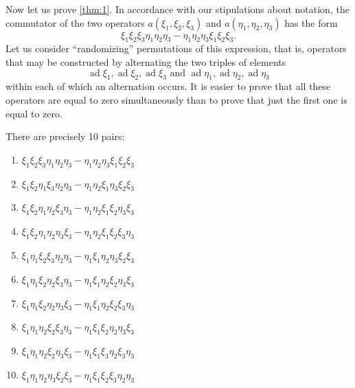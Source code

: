 \documentclass[a4paper]{article}
\newcommand{\ad}{\operatorname{ad}}
\begin{document}
Now let us prove \cref{thm:1}.
In accordance with our stipulations about notation, the commutator of the two operators $a(\xi_1, \xi_2, \xi_3)$ and $a(\eta_1, \eta_2, \eta_3)$ has the form
\begin{equation*}
	\xi_1 \xi_2 \xi_3 \eta_1 \eta_2 \eta_3-\eta_1 \eta_2 \eta_3 \xi_1 \xi_2 \xi_3.
\end{equation*}
Let us consider ``randomizing'' permutations of this expression, that is, operators that may be constructed by alternating the two triples of elements
\begin{equation*}
	\ad \xi_1, \ad \xi_2, \ad \xi_3 \text { and } \ad \eta_1, \ad \eta_2, \ad \eta_3
\end{equation*}
within each of which an alternation occurs.
It is easier to prove that all these operators are equal to zero simultaneously than to prove that just the first one is equal to zero.

There are precisely 10 pairs:
\begin{enumerate}[label=\Roman*., itemsep=0mm]
	\item $\xi_1\xi_2\xi_3\eta_1\eta_2\eta_3-\eta_1\eta_2\eta_3\xi_1\xi_2\xi_3$
	
	\item $\xi_1 \xi_2 \eta_1 \xi_3 \eta_2 \eta_3 - \eta_1 \eta_2 \xi_1 \eta_3 \xi_2 \xi_3$
	
	\item $\xi_1 \xi_2 \eta_1 \eta_2 \xi_3 \eta_3 - \eta_1 \eta_2 \xi_1 \xi_2 \eta_3 \xi_3$
	
	\item $\xi_1 \xi_2 \eta_1 \eta_2 \eta_3 \xi_3 - \eta_1 \eta_2 \xi_1 \xi_2 \xi_3 \eta_3$
	
	\item $\xi_1 \eta_1 \xi_2 \xi_3 \eta_2 \eta_3 - \eta_1 \xi_1 \eta_2 \eta_3 \xi_2 \xi_3$

	\item $\xi_1 \eta_1 \xi_2 \eta_2 \xi_3 \eta_3 - \eta_1 \xi_1 \eta_2 \xi_2 \eta_3 \xi_3$
	
	\item $\xi_1 \eta_1 \xi_2 \eta_2 \eta_3 \xi_3 - \eta_1 \xi_1 \eta_2 \xi_2 \xi_3 \eta_3$
	
	\item $\xi_1 \eta_1 \eta_2 \xi_2 \xi_3 \eta_3 - \eta_1 \xi_1 \xi_2 \eta_2 \eta_3 \xi_3$
	
	\item $\xi_1 \eta_1 \eta_2 \xi_2 \eta_3 \xi_3 - \eta_1 \xi_1 \xi_3 \eta_2 \xi_3 \eta_3$
	
	\item $\xi_1 \eta_1 \eta_2 \eta_3 \xi_2 \xi_3 - \eta_1\xi_1 \xi_2 \xi_3 \eta_2 \eta_3$
\end{enumerate}
\end{document}
